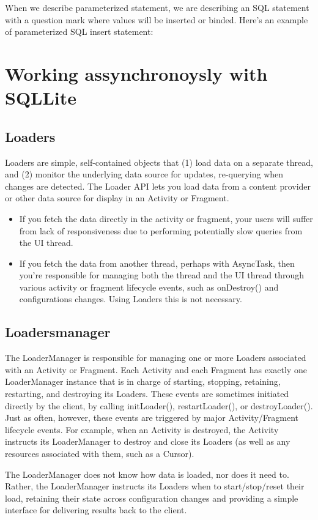 When we describe parameterized statement, we are describing an SQL statement with a question mark where values will be inserted or binded. Here's an example of parameterized SQL insert statement:

\section{Working assynchronoysly with SQLLite}
\subsection{Loaders}
Loaders are  simple, self-contained objects that (1) load data on a separate thread, and (2) monitor the underlying data source for updates, re-querying when changes are detected. The Loader API lets you load data from a content provider or other data source for display in an Activity or Fragment.
\begin{itemize}
	\item If you fetch the data directly in the activity or fragment, your users will suffer from lack of responsiveness due to performing potentially slow queries from the UI thread.
	\item If you fetch the data from another thread, perhaps with AsyncTask, then you're responsible for managing both the thread and the UI thread through various activity or fragment lifecycle events, such as onDestroy() and configurations changes. Using Loaders this is not necessary.
\end{itemize}

\subsection{Loadersmanager}
The LoaderManager is responsible for managing one or more Loaders associated with an Activity or Fragment. Each Activity and each Fragment has exactly one LoaderManager instance that is in charge of starting, stopping, retaining, restarting, and destroying its Loaders. These events are sometimes initiated directly by the client, by calling initLoader(), restartLoader(), or destroyLoader(). Just as often, however, these events are triggered by major Activity/Fragment lifecycle events. For example, when an Activity is destroyed, the Activity instructs its LoaderManager to destroy and close its Loaders (as well as any resources associated with them, such as a Cursor).

The LoaderManager does not know how data is loaded, nor does it need to. Rather, the LoaderManager instructs its Loaders when to start/stop/reset their load, retaining their state across configuration changes and providing a simple interface for delivering results back to the client. 

